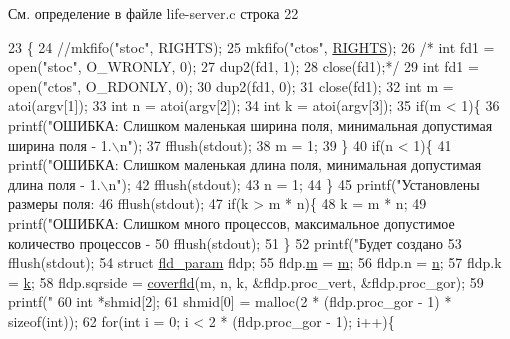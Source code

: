 См. определение в файле life-\/server.\+c строка 22


\begin{DoxyCode}
23 \{
24     \textcolor{comment}{//mkfifo("stoc", RIGHTS);}
25     mkfifo(\textcolor{stringliteral}{"ctos"}, \hyperlink{life-client_8c_a06fc87d81c62e9abb8790b6e5713c55bafa588afcf6a1d45e5503f8fb1f189df2}{RIGHTS});
26    \textcolor{comment}{/* int fd1 = open("stoc", O\_WRONLY, 0);}
27 \textcolor{comment}{    dup2(fd1, 1);}
28 \textcolor{comment}{    close(fd1);*/}
29     \textcolor{keywordtype}{int} fd1 = open(\textcolor{stringliteral}{"ctos"}, O\_RDONLY, 0);
30     dup2(fd1, 0);
31     close(fd1);
32     \textcolor{keywordtype}{int} m = atoi(argv[1]);
33     \textcolor{keywordtype}{int} n = atoi(argv[2]);
34     \textcolor{keywordtype}{int} k = atoi(argv[3]);
35     \textcolor{keywordflow}{if}(m < 1)\{
36         printf(\textcolor{stringliteral}{"ОШИБКА: Слишком маленькая ширина поля, минимальная допустимая ширина поля - 1.\(\backslash\)n"});
37         fflush(stdout);
38         m = 1;
39     \}
40     \textcolor{keywordflow}{if}(n < 1)\{
41         printf(\textcolor{stringliteral}{"ОШИБКА: Слишком маленькая длина поля, минимальная допустимая длина поля - 1.\(\backslash\)n"});
42         fflush(stdout);
43         n = 1;
44     \}
45     printf(\textcolor{stringliteral}{"Установлены размеры поля: %
46     fflush(stdout);
47     \textcolor{keywordflow}{if}(k > m * n)\{
48         k = m * n;
49         printf(\textcolor{stringliteral}{"ОШИБКА: Слишком много процессов, максимальное допустимое количество процессов - %
50         fflush(stdout);
51     \}
52     printf(\textcolor{stringliteral}{"Будет создано %
53     fflush(stdout);
54     \textcolor{keyword}{struct }\hyperlink{structfld__param}{fld\_param} fldp;
55     fldp.\hyperlink{structfld__param_a742204794ea328ba293fe59cec79b990}{m} = \hyperlink{structfld__param_a742204794ea328ba293fe59cec79b990}{m};
56     fldp.n = \hyperlink{structfld__param_a76f11d9a0a47b94f72c2d0e77fb32240}{n};
57     fldp.k = \hyperlink{structfld__param_ab66ed8e0098c0a86b458672a55a9cca9}{k};
58     fldp.sqrside = \hyperlink{lifefld_8c_a32300bb46d9c00fa91aeabb9966f8b35}{coverfld}(m, n, k, &fldp.proc\_vert, &fldp.proc\_gor);
59     printf(\textcolor{stringliteral}{"%
60     \textcolor{keywordtype}{int} *shmid[2];
61     shmid[0] = malloc(2 * (fldp.proc\_gor - 1) * \textcolor{keyword}{sizeof}(\textcolor{keywordtype}{int}));
62     \textcolor{keywordflow}{for}(\textcolor{keywordtype}{int} i = 0; i < 2 * (fldp.proc\_gor - 1); i++)\{
}}}}
\end{DoxyCode}
